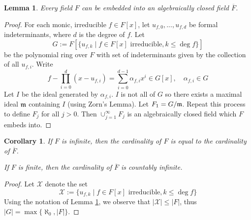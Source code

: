 \documentclass[12pt]{article}
\theoremstyle{plain}
\newtheorem{lemma}[thm]{Lemma}
\newtheorem{cor}[thm]{Corollary}
\theoremstyle{definition}
\newcommand{\scr}[1]{\mathscr{#1}}
\begin{document}
	\begin{lemma}
		\label{algebraicclosure}
		Every field $F$ can be embedded into an algebraically closed field $\overline{F}$.
	\end{lemma}
	\begin{proof}
		For each monic, irreducible $f \in F[x]$, let $u_{f,0},...,u_{f,d}$ be formal indeterminants, where $d$ is the degree of $f$. Let 
		\begin{equation}
			G := F[\lbrace u_{f,k} \mid f \in F[x]\text{ irreducible}, k \leq \operatorname{deg}f\rbrace]
			\end{equation}
		be the polynomial ring over $F$ with set of indeterminants given by the collection of all $u_{f,i}$. Write
		\[f - \prod_{i = 0}^d(x - u_{f,i}) = \sum_{i = 0}^{d-1}\alpha_{f,i}x^i \in G[x],\quad \alpha_{f,i} \in G\]
		Let $I$ be the ideal generated by $\alpha_{f,i}$. $I$ is not all of $G$ so there exists a maximal ideal $\frak{m}$ containing $I$ (using Zorn's Lemma). Let $F_1 = G/\frak{m}$. Repeat this process to define $F_j$ for all $j > 0$. Then $\cup_{j = 1}^\infty F_j$ is an algebraically closed field which $F$ embeds into.
	\end{proof}

\begin{cor}
	If $F$ is infinite, then the cardinality of $F$ is equal to the cardinality of $\overline{F}$.
	
	If $F$ is finite, then the cardinality of $\overline{F}$ is countably infinite.
	\end{cor}
\begin{proof}
	Let $\scr{X}$ denote the set
	\begin{equation}
		\scr{X} := \{ u_{f,k} \mid f \in F[x]\text{ irreducible}, k \leq \operatorname{deg}f \}
		\end{equation}
	Using the notation of Lemma \ref{algebraicclosure}, we observe that $|\scr{X}| \leq | F |$, thus $|G| = \operatorname{max}\{ \aleph_0, |F| \}$.
	\end{proof}
\end{document}
